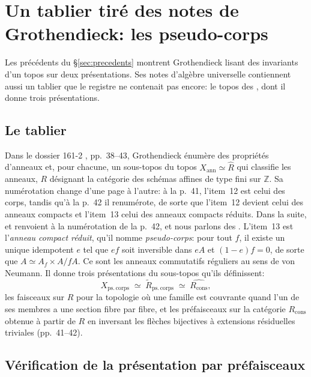\section{Un tablier tiré des notes de Grothendieck: les pseudo-corps}\label{sec:pseudofields}

Les précédents du \S\ref{sec:precedents} montrent Grothendieck lisant des invariants d'un topos sur deux présentations. Ses notes d'algèbre universelle contiennent aussi un tablier que le registre ne contenait pas encore: le topos des , dont il donne trois présentations.

\subsection{Le tablier}

Dans le dossier 161-2 \cite{grothendieck-161-2}, pp.~38--43, Grothendieck énumère des propriétés d'anneaux et, pour chacune, un sous-topos du topos $X_{\mathrm{ann}}\simeq\widehat R$ qui classifie les anneaux, $R$ désignant la catégorie des schémas affines de type fini sur $\mathbb Z$. Sa numérotation change d'une page à l'autre: à la p.~41, l'item~12 est celui des corps, tandis qu'à la p.~42 il renumérote, de sorte que l'item~12 devient celui des anneaux compacts et l'item~13 celui des anneaux compacts réduits. Dans la suite,  et  renvoient à la numérotation de la p.~42, et nous parlons des . L'item~13 est l'\emph{anneau compact réduit}, qu'il nomme \emph{pseudo-corps}: pour tout $f$, il existe un unique idempotent $e$ tel que $ef$ soit inversible dans $eA$ et $(1-e)f=0$, de sorte que $A\simeq A_f\times A/fA$. Ce sont les anneaux commutatifs réguliers au sens de von Neumann. Il donne trois présentations du sous-topos qu'ils définissent:
\[
X_{\mathrm{ps.\,corps}}\;\simeq\;\widetilde R_{\mathrm{ps.\,corps}}\;\simeq\;\widehat{R_{\mathrm{cons}}},
\]
les faisceaux sur $R$ pour la topologie où une famille est couvrante quand l'un de ses membres a une section fibre par fibre, et les préfaisceaux sur la catégorie $R_{\mathrm{cons}}$ obtenue à partir de $R$ en inversant les flèches bijectives à extensions résiduelles triviales (pp.~41--42).

\subsection{Vérification de la présentation par préfaisceaux}

